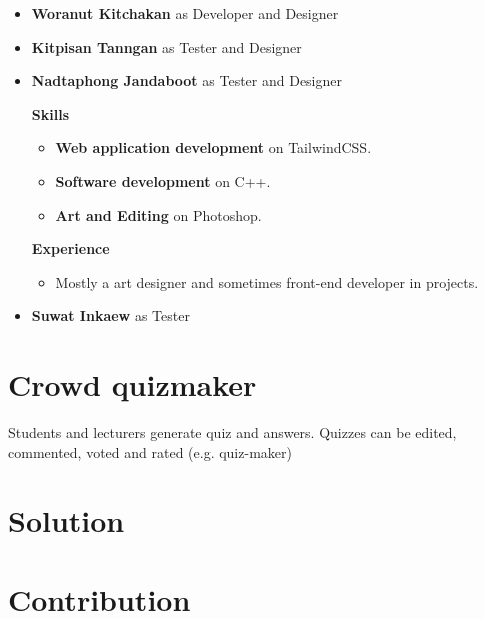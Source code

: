 \documentclass[a4paper, 12pt]{report}
\begin{document}
\begin{itemize}
            \item \textbf{Woranut Kitchakan} as Developer and Designer

            \item \textbf{Kitpisan Tanngan} as Tester and Designer

            \item \textbf{Nadtaphong Jandaboot} as Tester and Designer
            
                \textbf{Skills}
                \begin{itemize}
                    \item \textbf{Web application development} on TailwindCSS.
                    \item \textbf{Software development} on C++.
                    \item \textbf{Art and Editing} on Photoshop. 
                \end{itemize}

                \textbf{Experience}
                \begin{itemize}
                    \item Mostly a art designer and sometimes front-end developer in projects. 
                \end{itemize}

            \item \textbf{Suwat Inkaew} as Tester

        \end{itemize}

    \pagebreak
    \section*{Crowd quizmaker}
    Students and lecturers generate quiz and answers. Quizzes can be edited, commented, voted and rated (e.g. quiz-maker)

    \section*{Solution}

    \blindtext

    \pagebreak
    \section*{Contribution}
\end{document}
